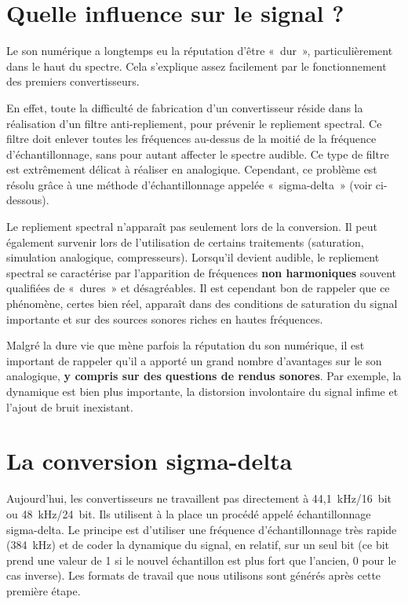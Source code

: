 \documentclass[
]{book}
\begin{document}
\hypertarget{quelle-influence-sur-le-signal}{%
\section{Quelle influence sur le signal ?}\label{quelle-influence-sur-le-signal}}

Le son numérique a longtemps eu la réputation d'être «~dur~», particulièrement dans le haut du spectre. Cela s'explique assez facilement par le fonctionnement des premiers convertisseurs.

En effet, toute la difficulté de fabrication d'un convertisseur réside dans la réalisation d'un filtre anti-repliement, pour prévenir le repliement spectral. Ce filtre doit enlever toutes les fréquences au-dessus de la moitié de la fréquence d'échantillonnage, sans pour autant affecter le spectre audible. Ce type de filtre est extrêmement délicat à réaliser en analogique. Cependant, ce problème est résolu grâce à une méthode d'échantillonnage appelée «~sigma-delta~» (voir ci-dessous).

Le repliement spectral n'apparaît pas seulement lors de la conversion. Il peut également survenir lors de l'utilisation de certains traitements (saturation, simulation analogique, compresseurs). Lorsqu'il devient audible, le repliement spectral se caractérise par l'apparition de fréquences \textbf{non harmoniques} souvent qualifiées de «~dures~» et désagréables. Il est cependant bon de rappeler que ce phénomène, certes bien réel, apparaît dans des conditions de saturation du signal importante et sur des sources sonores riches en hautes fréquences.

Malgré la dure vie que mène parfois la réputation du son numérique, il est important de rappeler qu'il a apporté un grand nombre d'avantages sur le son analogique, \textbf{y compris sur des questions de rendus sonores}. Par exemple, la dynamique est bien plus importante, la distorsion involontaire du signal infime et l'ajout de bruit inexistant.

\hypertarget{la-conversion-sigma-delta}{%
\section{La conversion sigma-delta}\label{la-conversion-sigma-delta}}

Aujourd'hui, les convertisseurs ne travaillent pas directement à 44,1~kHz/16~bit ou 48~kHz/24~bit. Ils utilisent à la place un procédé appelé échantillonnage sigma-delta. Le principe est d'utiliser une fréquence d'échantillonnage très rapide (384~kHz) et de coder la dynamique du signal, en relatif, sur un seul bit (ce bit prend une valeur de 1 si le nouvel échantillon est plus fort que l'ancien, 0 pour le cas inverse). Les formats de travail que nous utilisons sont générés après cette première étape.
\end{document}
